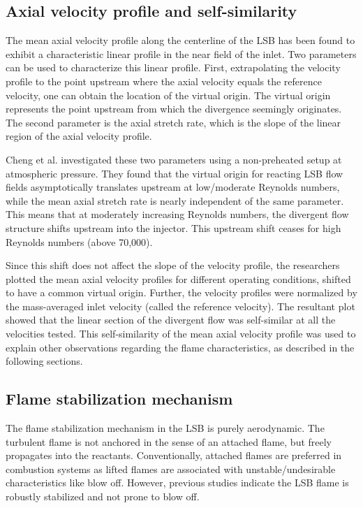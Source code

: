\subsection{Axial velocity profile and self-similarity}
\label{subsec:lsb-axial-velocity-profile}

The mean axial velocity profile along the centerline of the LSB has been found\cite{2006-cheng,2008-cheng-a} to exhibit a characteristic linear profile in the near field of the inlet.
Two parameters can be used to characterize this linear profile.
First, extrapolating the velocity profile to the point upstream where the axial velocity equals the reference velocity, one can obtain the location of the virtual origin.
The virtual origin represents the point upstream from which the divergence seemingly originates.
The second parameter is the axial stretch rate, which is the slope of the linear region of the axial velocity profile.

Cheng et al.\cite{2006-cheng,2008-cheng-a} investigated these two parameters using a non-preheated setup at atmospheric pressure.
They found that the virtual origin for reacting LSB flow fields asymptotically translates upstream at low/moderate Reynolds numbers, while the mean axial stretch rate is nearly independent of the same parameter.
This means that at moderately increasing Reynolds numbers, the divergent flow structure shifts upstream into the injector.
This upstream shift ceases for high Reynolds numbers (above 70,000).

Since this shift does not affect the slope of the velocity profile, the researchers plotted the mean axial velocity profiles for different operating conditions, shifted to have a common virtual origin.
Further, the velocity profiles were normalized by the mass-averaged inlet velocity (called the reference velocity).
The resultant plot showed that the linear section of the divergent flow was self-similar at all the velocities tested.
This self-similarity of the mean axial velocity profile was used to explain other observations regarding the flame characteristics, as described in the following sections.

\subsection{Flame stabilization mechanism}
\label{subsec:lsb-flame-stabilization-mechanism}



The flame stabilization mechanism in the LSB is purely aerodynamic.
The turbulent flame is not anchored in the sense of an attached flame, but freely propagates into the reactants.
Conventionally, attached flames are preferred in combustion systems as lifted flames are associated with unstable/undesirable characteristics like blow off.
However, previous studies\cite{2005-johnson} indicate the LSB flame is robustly stabilized and not prone to blow off.

